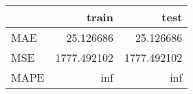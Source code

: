 \begin{tabular}{lrr}
\toprule
{} &        train &         test \\
\midrule
MAE  &    25.126686 &    25.126686 \\
MSE  &  1777.492102 &  1777.492102 \\
MAPE &          inf &          inf \\
\bottomrule
\end{tabular}
